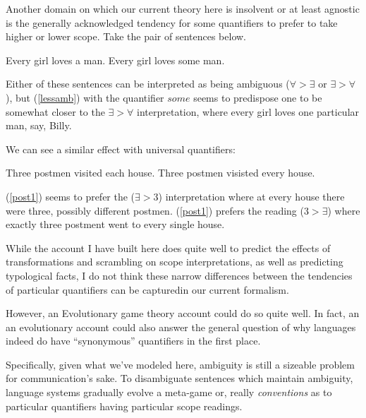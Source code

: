 \documentclass{article}
\begin{document}
Another domain on which our current theory here is insolvent or at least agnostic is the generally acknowledged tendency for some quantifiers to prefer to take higher or lower scope. Take the pair of sentences below.

\begin{exe}
	\ex \begin{xlist}
	\ex Every girl loves a man.
	\ex Every girl loves some man.\label{lessamb}
	\end{xlist}
\end{exe}

Either of these sentences can be interpreted as being ambiguous (${\forall}>{\exists}$ or ${\exists}>{\forall}$), but (\ref{lessamb}) with the quantifier $some$ seems to predispose one to be somewhat closer to the ${\exists}>{\forall}$ interpretation, where every girl loves one particular man, say, Billy.

We can see a similar effect with universal quantifiers:

\begin{exe}
	\ex \begin{xlist}
		\ex Three postmen visited each house.\label{post1}
		\ex Three postmen visisted every house.\label{post2}
	\end{xlist}
\end{exe}

(\ref{post1}) seems to prefer the (${\exists}>3$) interpretation where at every house there were three, possibly different postmen.
(\ref{post1}) prefers the reading ($3>{\exists}$) where exactly three postment went to every single house.

While the account I have built here does quite well to predict the effects of transformations and scrambling on scope interpretations, as well as predicting typological facts, I do not think these narrow differences between the tendencies of particular quantifiers can be capturedin our current formalism.

However, an Evolutionary game theory account could do so quite well.
In fact, an an evolutionary account could also answer the general question of why languages indeed do have ``synonymous'' quantifiers in the first place.

Specifically, given what we've modeled here, ambiguity is still a sizeable problem for communication's sake.
To disambiguate sentences which maintain ambiguity, language systems gradually evolve a meta-game or, really \emph{conventions} as to particular quantifiers having particular scope readings.
\end{document}
